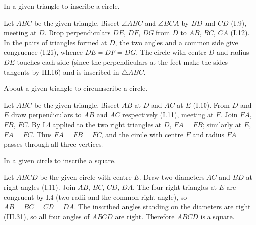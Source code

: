 \documentclass{rrxiv}
\begin{document}
\begin{claim}
\label{prop:IV.4}
In a given triangle to inscribe a circle.
\end{claim}
\begin{evidence}[Proof of IV.4]
\label{ev:IV.4}
Let $ABC$ be the given triangle.  Bisect $\angle ABC$ and $\angle BCA$
by $BD$ and $CD$ (I.9), meeting at $D$.  Drop perpendiculars $DE$,
$DF$, $DG$ from $D$ to $AB$, $BC$, $CA$ (I.12).  In the pairs of
triangles formed at $D$, the two angles and a common side give
congruence (I.26), whence $DE = DF = DG$.  The circle with centre $D$
and radius $DE$ touches each side (since the perpendiculars at the
feet make the sides tangents by III.16) and is inscribed in
$\triangle ABC$.
\end{evidence}

\begin{claim}
\label{prop:IV.5}
About a given triangle to circumscribe a circle.
\end{claim}
\begin{evidence}[Proof of IV.5]
\label{ev:IV.5}
Let $ABC$ be the given triangle.  Bisect $AB$ at $D$ and $AC$ at $E$
(I.10).  From $D$ and $E$ draw perpendiculars to $AB$ and $AC$
respectively (I.11), meeting at $F$.  Join $FA$, $FB$, $FC$.  By I.4
applied to the two right triangles at $D$, $FA = FB$; similarly at
$E$, $FA = FC$.  Thus $FA = FB = FC$, and the circle with centre $F$
and radius $FA$ passes through all three vertices.
\end{evidence}

\begin{claim}
\label{prop:IV.6}
In a given circle to inscribe a square.
\end{claim}
\begin{evidence}[Proof of IV.6]
\label{ev:IV.6}
Let $ABCD$ be the given circle with centre $E$.  Draw two diameters
$AC$ and $BD$ at right angles (I.11).  Join $AB$, $BC$, $CD$, $DA$.
The four right triangles at $E$ are congruent by I.4 (two radii and
the common right angle), so $AB = BC = CD = DA$.  The inscribed
angles standing on the diameters are right (III.31), so all four
angles of $ABCD$ are right.  Therefore $ABCD$ is a square.
\end{evidence}
\end{document}
